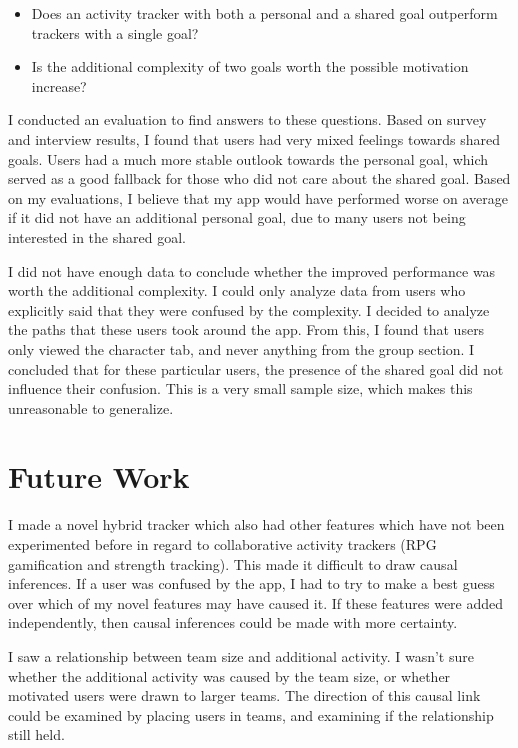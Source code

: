 \documentclass{l4proj}
\begin{document}
\begin{itemize}
  \item Does an activity tracker with both a personal and a shared goal outperform trackers with a single goal?
  \item Is the additional complexity of two goals worth the possible motivation increase?
\end{itemize}

I conducted an evaluation to find answers to these questions. Based on survey and interview results, I found that users had very mixed feelings towards shared goals. Users had a much more stable outlook towards the personal goal, which served as a good fallback for those who did not care about the shared goal. Based on my evaluations, I believe that my app would have performed worse on average if it did not have an additional personal goal, due to many users not being interested in the shared goal.

I did not have enough data to conclude whether the improved performance was worth the additional complexity. I could only analyze data from users who explicitly said that they were confused by the complexity. I decided to analyze the paths that these users took around the app. From this, I found that users only viewed the character tab, and never anything from the group section. I concluded that for these particular users, the presence of the shared goal did not influence their confusion. This is a very small sample size, which makes this unreasonable to generalize.

\section{Future Work}
I made a novel hybrid tracker which also had other features which have not been experimented before in regard to collaborative activity trackers (RPG gamification and strength tracking). This made it difficult to draw causal inferences. If a user was confused by the app, I had to try to make a best guess over which of my novel features may have caused it. If these features were added independently, then causal inferences could be made with more certainty. 

I saw a relationship between team size and additional activity. I wasn't sure whether the additional activity was caused by the team size, or whether motivated users were drawn to larger teams. The direction of this causal link could be examined by placing users in teams, and examining if the relationship still held.
\end{document}
